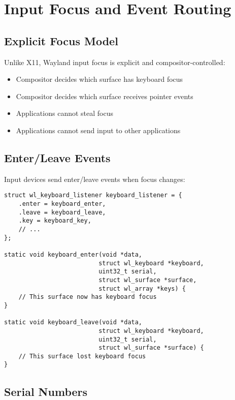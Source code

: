 \section{Input Focus and Event Routing}

\subsection{Explicit Focus Model}

Unlike X11, Wayland input focus is explicit and compositor-controlled:

\begin{itemize}
    \item Compositor decides which surface has keyboard focus
    \item Compositor decides which surface receives pointer events
    \item Applications cannot steal focus
    \item Applications cannot send input to other applications
\end{itemize}

\subsection{Enter/Leave Events}

Input devices send enter/leave events when focus changes:

\begin{lstlisting}[style=cstyle, caption=Keyboard Focus]
struct wl_keyboard_listener keyboard_listener = {
    .enter = keyboard_enter,
    .leave = keyboard_leave,
    .key = keyboard_key,
    // ...
};

static void keyboard_enter(void *data,
                          struct wl_keyboard *keyboard,
                          uint32_t serial,
                          struct wl_surface *surface,
                          struct wl_array *keys) {
    // This surface now has keyboard focus
}

static void keyboard_leave(void *data,
                          struct wl_keyboard *keyboard,
                          uint32_t serial,
                          struct wl_surface *surface) {
    // This surface lost keyboard focus
}
\end{lstlisting}

\subsection{Serial Numbers}

